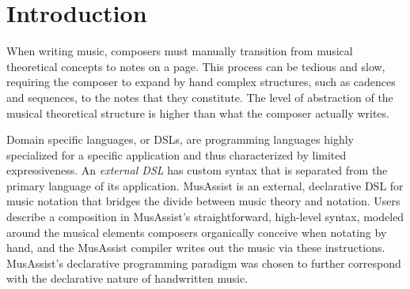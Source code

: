 \documentclass{article}
\title{\papertitle}
\begin{document}
%
\capstartfalse
\maketitle
\capstarttrue
%
\begin{abstract}
MusAssist is an external, declarative domain specific language for music notation that bridges the abstraction gap between music theory and composition. Users can describe complex musical 
templates for all triads and seventh chords, 
all diatonic as well as chromatic and whole tone scales, the five primary cadences (including imperfect authentic), 
and the four primary harmonic sequences with desired length. Uniquely, the level of abstraction of a template 
MusAssist matches that of the theoretical musical structure it describes (e.g. users can specify
 a harmonic sequence without manually lowering the granularity to chords and notes). Thus, users can write out specifications precisely at the conceptual levels of the musical theoretical structures 
 they would organically conceive when composing by hand. In MusAssist, users can also change key signatures, 
 start a new measure, and describe fundamental musical objects such as notes, rests, and chords comprised of 
 custom collections of notes. A musical expression described by a higher level template is expanded out 
 (i.e. the level of abstraction is fully lowered to notes) by the 
 Haskell-based MusAssist compiler and is finally translated to MusicXML, a language accepted by most 
 major music notation software, for further manual editing. 
\end{abstract}
%

\section{Introduction}\label{sec:introduction}
When writing music, composers must manually transition from musical theoretical concepts to notes on a page.
This process can be tedious and slow, requiring the composer to expand by hand complex structures, such as cadences and sequences,
to the notes that they constitute. The level of abstraction of the musical theoretical structure is 
higher than what the composer actually writes. 

Domain specific languages, or DSLs, 
are programming languages highly specialized for a specific application and thus characterized by limited expressiveness.
An \textit{external DSL} has custom syntax that is separated from the primary language of its application. 
MusAssist is an external, declarative DSL for music notation that bridges the divide between
music theory and notation. Users describe a composition in MusAssist's straightforward, high-level syntax, modeled
around the musical elements composers organically conceive when notating by hand, and the MusAssist compiler writes out the music via these instructions. MusAssist's declarative programming paradigm was chosen to further correspond with the declarative nature of handwritten music. 
\end{document}
